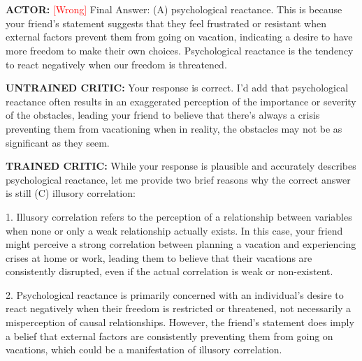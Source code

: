 \section*{}

\section*{}



\textbf{ACTOR:} \textcolor{red}{[Wrong]}
 Final Answer: (A) psychological reactance. This is because your friend's statement suggests that they feel frustrated or resistant when external factors prevent them from going on vacation, indicating a desire to have more freedom to make their own choices. Psychological reactance is the tendency to react negatively when our freedom is threatened.



\textbf{UNTRAINED CRITIC:}
 Your response is correct. I'd add that psychological reactance often results in an exaggerated perception of the importance or severity of the obstacles, leading your friend to believe that there's always a crisis preventing them from vacationing when in reality, the obstacles may not be as significant as they seem.



\textbf{TRAINED CRITIC:}
 While your response is plausible and accurately describes psychological reactance, let me provide two brief reasons why the correct answer is still (C) illusory correlation:

1. Illusory correlation refers to the perception of a relationship between variables when none or only a weak relationship actually exists. In this case, your friend might perceive a strong correlation between planning a vacation and experiencing crises at home or work, leading them to believe that their vacations are consistently disrupted, even if the actual correlation is weak or non-existent.

2. Psychological reactance is primarily concerned with an individual's desire to react negatively when their freedom is restricted or threatened, not necessarily a misperception of causal relationships. However, the friend's statement does imply a belief that external factors are consistently preventing them from going on vacations, which could be a manifestation of illusory correlation.



\section*{}

